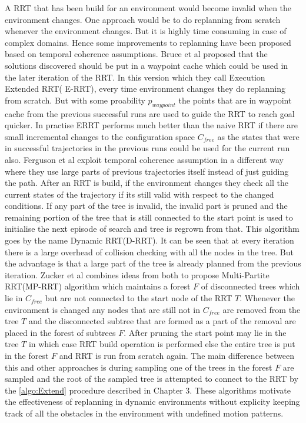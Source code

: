 \documentclass[MTech]{iitmdiss}
\begin{document}
A RRT that has been build for an environment would become invalid when the environment changes. One approach would be to do replanning from scratch whenever the environment changes. But it is highly time consuming in case of complex domains. Hence some improvements to replanning have been proposed based on temporal coherence assumptions. Bruce et al
\cite{errt}
 proposed that the solutions discovered should be put in a waypoint cache which could be used in the later iteration of the RRT. In this version which they call Execution Extended RRT( E-RRT), every time environment changes they do replanning from scratch. But with some proability $p_{waypoint}$ the points that are in waypoint cache from the previous successful runs are used to guide the RRT to reach goal quicker. In practise ERRT performs much better than the naive RRT
 \cite{errt}
 if there are small incremental changes to the configuration space $C_{free}$ as the states that were in successful trajectories in the previous runs could be used for the current run also. Ferguson et al
\cite{drrt}
 exploit temporal coherence assumption in a different way where they use large parts of previous trajectories itself instead of just guiding the path. After an RRT is build, if the environment changes they check all the current states of the trajectory if its still valid with respect to the changed conditions. If any part of the tree is invalid, the invalid part is pruned and the remaining portion of the tree that is still connected to the start point is used to initialise the next episode of search and tree is regrown from that. This algorithm goes by the name Dynamic RRT(D-RRT). It can be seen that at every iteration there is a large overhead of collision checking with all the nodes in the tree. But the advantage is that a large part of the tree is already planned from the previous iteration.  Zucker et al
 \cite{mprrt}
  combines ideas from both to propose Multi-Partite RRT(MP-RRT) algorithm which maintains a forest $F$ of disconnected trees which lie in $C_{free}$ but are not connected to the start node of the RRT $T$. Whenever the environment is changed any nodes that are still not in $C_{free}$ are removed from the tree $T$ and the disconnected subtree that are formed as a part of the removal are placed in the forest of subtrees $F$. After pruning the start point may lie in the tree $T$ in which case RRT build operation is performed else the entire tree is put in the forest $F$ and RRT is run from scratch again. The main difference between this and other approaches is during sampling one of the trees in the forest $F$ are sampled and the root of the sampled tree is attempted to connect to the RRT by the \ref{algo:Extend} procedure described in Chapter 3. These algorithms motivate the effectiveness of replanning in dynamic environments without explicity keeping track of all the obstacles in the environment with undefined motion patterns.
 
\end{document}
